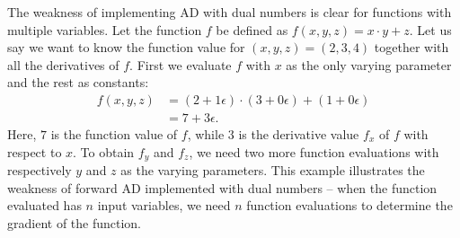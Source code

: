The weakness of implementing AD with dual numbers is clear for functions with multiple variables. Let the function $f$ be defined as $f(x,y,z) = x\cdot y + z$. Let us say we want to know the function value for $(x,y,z) = (2,3,4)$ together with all the derivatives of $f$. First we evaluate $f$ with $x$ as the only varying parameter and the rest as constants:
\begin{align*}
    f(x,y,z) &= (2+1\epsilon)\cdot(3+0\epsilon) + (1+0\epsilon)\\
        &=7+3\epsilon.
\end{align*}
Here, $7$ is the function value of $f$, while $3$ is the derivative value $f_x$ of $f$ with respect to $x$. To obtain $f_y$ and $f_z$, we need two more function evaluations with respectively $y$ and $z$ as the varying parameters. This example illustrates the weakness of forward AD implemented with dual numbers -- when the function evaluated has $n$ input variables, we need $n$ function evaluations to determine the gradient of the function.

